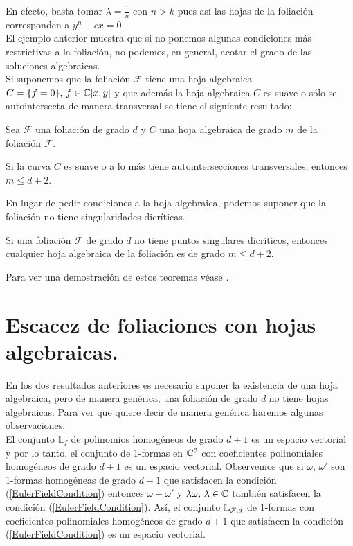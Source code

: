 En efecto, basta tomar $\lambda = \tfrac{1}{n}$ con $n>k$ pues así las hojas de la foliación corresponden a $y^n - cx = 0$.
\\

El ejemplo anterior muestra que si no ponemos algunas condiciones más restrictivas a la foliación, no podemos, en general, acotar el grado de las soluciones algebraicas.\\

Si suponemos que la foliación $\mathcal{F}$ tiene una hoja algebraica $C=\{ f=0\}, \, f\in\mathbb{C}[x,y]$ y que además la hoja algebraica $C$ es suave o sólo se autointersecta de manera transversal se tiene el siguiente resultado:\\

\begin{Teorema}
\label{Teo:CotaHojaSuave}
Sea $\mathcal{F}$ una foliación de grado $d$ y $C$ una hoja algebraica de grado $m$ de la foliación $\mathcal{F}$.

Si la curva $C$ es suave o a lo más tiene autointersecciones transversales, entonces $m\leq d+2$.
\end{Teorema}

En lugar de pedir condiciones a la hoja algebraica, podemos suponer que la foliación no tiene singularidades dicríticas.

\begin{Teorema}
\label{Teo:CotaSingularidadesNoDicriticas}
Si una foliación $\mathcal{F}$ de grado $d$ no tiene puntos singulares dicríticos, entonces cualquier hoja algebraica de la foliación es de grado $m\leq d+2$.
\end{Teorema}

Para ver una demostración de estos teoremas véase \cite{IlyaYako}.

\section{Escacez de foliaciones con hojas algebraicas.}

En los dos resultados anteriores es necesario suponer la existencia de una hoja algebraica, pero de manera genérica, una foliación de grado $d$ no tiene hojas algebraicas. Para ver que quiere decir de manera genérica haremos algunas observaciones.\\

El conjunto $\mathbb{L}_{f}$ de polinomios homogéneos de grado $d+1$ es un espacio vectorial y por lo tanto, el conjunto de 1-formas en $\mathbb{C}^{3}$ con coeficientes polinomiales homogéneos de grado $d+1$ es un espacio vectorial. Observemos que si $\omega, \, \omega'$ son 1-formas homogéneas de grado $d+1$ que satisfacen la condición (\ref{EulerFieldCondition}) entonces $\omega + \omega'$ y $\lambda\omega,\, \lambda\in\mathbb{C}$ también satisfacen la condición (\ref{EulerFieldCondition}). Así, el conjunto $\mathbb{L}_{\mathcal{F},d}$ de 1-formas  con coeficientes polinomiales homogéneos  de grado $d+1$ que satisfacen la condición (\ref{EulerFieldCondition}) es un espacio vectorial.\\


